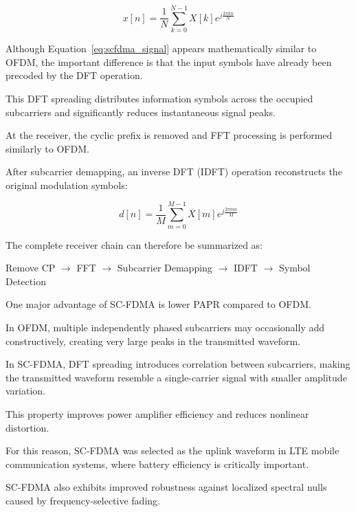 \begin{equation}
x[n]=
\frac{1}{N}
\sum_{k=0}^{N-1}
X[k]
e^{j\frac{2\pi kn}{N}}
\label{eq:scfdma_signal}
\end{equation}

Although Equation~\ref{eq:scfdma_signal} appears mathematically similar
to OFDM, the important difference is that the input symbols have already
been precoded by the DFT operation.

This DFT spreading distributes information symbols across the occupied
subcarriers and significantly reduces instantaneous signal peaks.

\vspace{0.3cm}

At the receiver, the cyclic prefix is removed and FFT processing is
performed similarly to OFDM.

After subcarrier demapping, an inverse DFT (IDFT) operation reconstructs
the original modulation symbols:

\begin{equation}
d[n]=\frac{1}{M}
\sum_{m=0}^{M-1}
X[m]e^{j\frac{2\pi mn}{M}}
\label{eq:idft_despreading}
\end{equation}

The complete receiver chain can therefore be summarized as:

\begin{center}
Remove CP $\rightarrow$ FFT $\rightarrow$
Subcarrier Demapping $\rightarrow$
IDFT $\rightarrow$ Symbol Detection
\end{center}

One major advantage of SC-FDMA is lower PAPR compared to OFDM.

In OFDM, multiple independently phased subcarriers may occasionally add
constructively, creating very large peaks in the transmitted waveform.

In SC-FDMA, DFT spreading introduces correlation between subcarriers,
making the transmitted waveform resemble a single-carrier signal with
smaller amplitude variation.

This property improves power amplifier efficiency and reduces nonlinear
distortion.

For this reason, SC-FDMA was selected as the uplink waveform in LTE mobile
communication systems, where battery efficiency is critically important.

\vspace{0.3cm}

SC-FDMA also exhibits improved robustness against localized spectral nulls
caused by frequency-selective fading.

